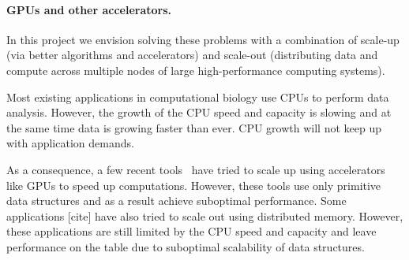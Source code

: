 















\paragraph{GPUs and other accelerators.}

In this project we envision solving these problems with a combination of  scale-up (via better algorithms and accelerators) and scale-out (distributing data and compute across multiple nodes of large high-performance computing systems). 


Most existing applications in computational biology use CPUs to perform data  analysis.
However, the growth of the CPU speed and capacity is slowing and at the same time data is growing faster than ever. CPU growth will not keep up with application demands.

As a consequence, a few recent tools~\cite{cite-something} have tried to scale
up using accelerators like GPUs to speed up computations. However, these tools
use only primitive data structures and as a result achieve suboptimal
performance. Some applications [cite] have also tried to scale out using
distributed memory.  However, these applications are still limited by the CPU
speed and capacity and leave performance on the table due to suboptimal
scalability of data structures.





